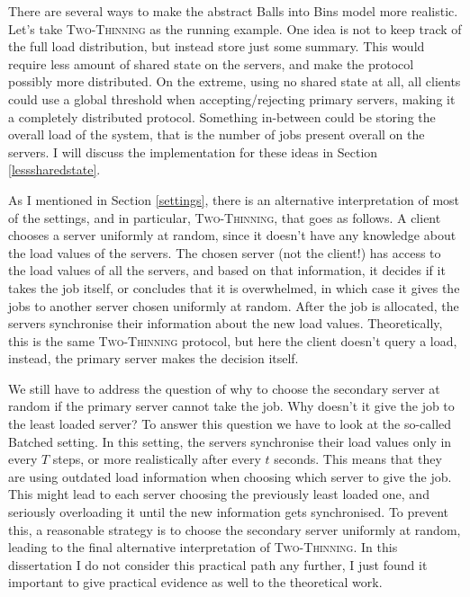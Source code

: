 There are several ways to make the abstract Balls into Bins model more realistic. Let's take \textsc{Two-Thinning} as the running example. One idea is not to keep track of the full load distribution, but instead store just some summary. This would require less amount of shared state on the servers, and make the protocol possibly more distributed. On the extreme, using no shared state at all, all clients could use a global threshold when accepting/rejecting primary servers, making it a completely distributed protocol. Something in-between could be storing the overall load of the system, that is the number of jobs present overall on the servers. I will discuss the implementation for these ideas in Section \ref{lesssharedstate}.


As I mentioned in Section \ref{settings}, there is an alternative interpretation of most of the settings, and in particular, \textsc{Two-Thinning}, that goes as follows. A client chooses a server uniformly at random, since it doesn't have any knowledge about the load values of the servers. The chosen server (not the client!) has access to the load values of all the servers, and based on that information, it decides if it takes the job itself, or concludes that it is overwhelmed, in which case it gives the jobs to another server chosen uniformly at random. After the job is allocated, the servers synchronise their information about the new load values. Theoretically, this is the same \textsc{Two-Thinning} protocol, but here the client doesn't query a load, instead, the primary server makes the decision itself.


We still have to address the question of why to choose the secondary server at random if the primary server cannot take the job. Why doesn't it give the job to the least loaded server? To answer this question we have to look at the so-called Batched setting. In this setting, the servers synchronise their load values only in every $T$ steps, or more realistically after every $t$ seconds. This means that they are using outdated load information when choosing which server to give the job. This might lead to each server choosing the previously least loaded one, and seriously overloading it until the new information gets synchronised. To prevent this, a reasonable strategy is to choose the secondary server uniformly at random, leading to the final alternative interpretation of \textsc{Two-Thinning}. In this dissertation I do not consider this practical path any further, I just found it important to give practical evidence as well to the theoretical work.


